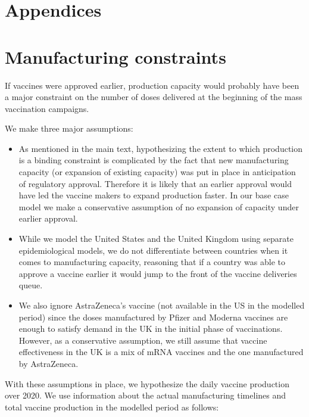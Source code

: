 \documentclass{article}
\providecommand{\tightlist}{%
  \setlength{\itemsep}{0pt}\setlength{\parskip}{0pt}}
\begin{document}
\appendix


\setcounter{table}{0} \renewcommand{\thetable}{S\arabic{table}} \setcounter{figure}{0} \renewcommand{\thefigure}{S\arabic{figure}}

\section*{Appendices}\label{appendices}

\section{Manufacturing constraints}\label{manufacturing-constraints}

If vaccines were approved earlier, production capacity would probably have been a major constraint on the number of doses delivered at the beginning of the mass vaccination campaigns.

We make three major assumptions:

\begin{itemize}
\tightlist
\item
  As mentioned in the main text, hypothesizing the extent to which production is a binding constraint is complicated by the fact that new manufacturing capacity (or expansion of existing capacity) was put in place in anticipation of regulatory approval. Therefore it is likely that an earlier approval would have led the vaccine makers to expand production faster. In our base case model we make a conservative assumption of no expansion of capacity under earlier approval.
\item
  While we model the United States and the United Kingdom using separate epidemiological models, we do not differentiate between countries when it comes to manufacturing capacity, reasoning that if a country was able to approve a vaccine earlier it would jump to the front of the vaccine deliveries queue.
\item
  We also ignore AstraZeneca's vaccine (not available in the US in the modelled period) since the doses manufactured by Pfizer and Moderna vaccines are enough to satisfy demand in the UK in the initial phase of vaccinations. However, as a conservative assumption, we still assume that vaccine effectiveness in the UK is a mix of mRNA vaccines and the one manufactured by AstraZeneca.
\end{itemize}

With these assumptions in place, we hypothesize the daily vaccine production over 2020. We use information about the actual manufacturing timelines and total vaccine production in the modelled period as follows:
\end{document}
